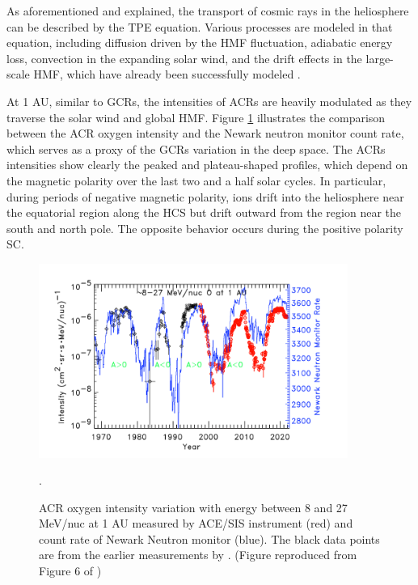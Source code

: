 As aforementioned and explained, the transport of cosmic rays in the heliosphere can be described by the \ac{TPE} equation. Various processes are modeled in that equation, including diffusion driven by the \ac{HMF} fluctuation, adiabatic energy loss, convection in the expanding solar wind, and the drift effects in the large-scale \ac{HMF}, which have already been successfully modeled \citep{Parker1965Pss, Jokipii1977ApJ, Jokipii1981ApJ}.

At 1 AU, similar to \acp{GCR}, the intensities of \acp{ACR} are heavily modulated as they traverse the solar wind and global \ac{HMF}. Figure \ref{Fig:ACR_solarmodulation} illustrates the comparison between the \ac{ACR} oxygen intensity and the Newark neutron monitor count rate, which serves as a proxy of the \acp{GCR} variation in the deep space. The \acp{ACR} intensities show clearly the peaked and plateau-shaped profiles, which depend on the magnetic polarity over the last two and a half solar cycles. In particular, during periods of negative magnetic polarity, ions drift into the heliosphere near the equatorial region along the \ac{HCS} but drift outward from the region near the south and north pole. The opposite behavior occurs during the positive polarity \acl{SC}.



\begin{figure}
    \centering
    \includegraphics[width = 0.9\textwidth]{images/ACR_solarmodulation.png}
    \caption[Long term variation of \ac{ACR} oxygen and neutron monitor count rate]{ACR oxygen intensity variation with energy between 8 and 27 MeV/nuc at 1 AU measured by ACE/SIS instrument (red) and count rate of Newark Neutron monitor (blue). The black data points are from the earlier measurements by \citet{Mewaldt1993GeoRL}. (Figure reproduced from Figure 6 of \citet{Giacalone2022SSRv})}.
    \label{Fig:ACR_solarmodulation}
\end{figure}


